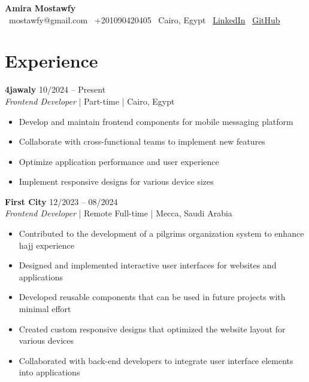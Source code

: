 \documentclass[11pt,a4paper]{article}
\begin{document}
\begin{center}
{\Huge\textbf{Amira Mostawfy}}\\[0.5em]
\faEnvelope\ mostawfy@gmail.com \quad
\faPhone\ +201090420405 \quad
\faMapMarker\ Cairo, Egypt \quad
\faLinkedin\ \href{https://linkedin.com/in/amiramostawfy}{LinkedIn} \quad
\faGithub\ \href{https://github.com/mostawfy}{GitHub}

\end{center}

\section*{Experience}

\noindent\textbf{4jawaly} \hfill 10/2024 -- Present\\
\textit{Frontend Developer} | Part-time | Cairo, Egypt\\
\vspace{-1em}
\begin{itemize}
    \item Develop and maintain frontend components for mobile messaging platform
    \item Collaborate with cross-functional teams to implement new features
    \item Optimize application performance and user experience
    \item Implement responsive designs for various device sizes
\end{itemize}

\vspace{0.2cm}

\noindent\textbf{First City} \hfill 12/2023 -- 08/2024\\
\textit{Frontend Developer} | Remote Full-time | Mecca, Saudi Arabia\\
\vspace{-1em}
\begin{itemize}
    \item Contributed to the development of a pilgrims organization system to enhance hajj experience
    \item Designed and implemented interactive user interfaces for websites and applications
    \item Developed reusable components that can be used in future projects with minimal effort
    \item Created custom responsive designs that optimized the website layout for various devices
    \item Collaborated with back-end developers to integrate user interface elements into applications
\end{itemize}
\end{document}
